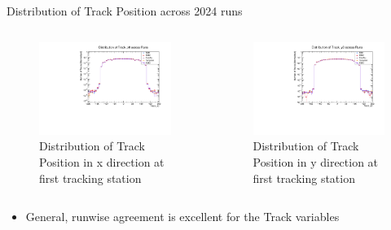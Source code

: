 \begin{frame}{Distribution of Track Position across 2024 runs}
	\begin{columns}
		\begin{column}{0.5\linewidth}
			\begin{figure}
				\includegraphics[width=\linewidth]{./RunwisePlots/Track_x0_runwise.pdf}
				\caption{Distribution of Track Position in x direction at first tracking station}
			\end{figure}
		\end{column}
		\begin{column}{0.5 \linewidth}
			\begin{figure}
				\includegraphics[width=\linewidth]{./RunwisePlots/Track_y0_runwise.pdf}
				\caption{Distribution of Track Position in y direction at first tracking station}
			\end{figure}
		\end{column}
	\end{columns}
	\begin{itemize}
		\item General, runwise agreement is excellent for the Track variables
	\end{itemize}
\end{frame}


